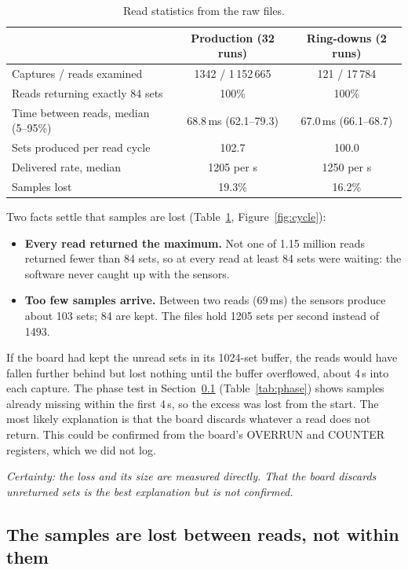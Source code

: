 \documentclass[11pt]{article}
\begin{document}
\begin{table}[H]
  \centering
  \begin{tabular}{lcc}
    \toprule
    & Production (32 runs) & Ring-downs (2 runs) \\
    \midrule
    Captures / reads examined & 1342 / 1\,152\,665 & 121 / 17\,784 \\
    Reads returning exactly 84 sets & 100\% & 100\% \\
    Time between reads, median (5--95\%) & 68.8\,ms (62.1--79.3) & 67.0\,ms (66.1--68.7) \\
    Sets produced per read cycle & 102.7 & 100.0 \\
    Delivered rate, median & 1205 per s & 1250 per s \\
    Samples lost & 19.3\% & 16.2\% \\
    \bottomrule
  \end{tabular}
  \caption{Read statistics from the raw files.}
  \label{tab:reads}
\end{table}

Two facts settle that samples are lost (Table~\ref{tab:reads},
Figure~\ref{fig:cycle}):
\begin{itemize}
  \item \textbf{Every read returned the maximum.} Not one of 1.15 million
        reads returned fewer than 84 sets, so at every read at least 84 sets
        were waiting: the software never caught up with the sensors.
  \item \textbf{Too few samples arrive.} Between two reads (69\,ms) the
        sensors produce about 103 sets; 84 are kept. The files hold 1205 sets
        per second instead of 1493.
\end{itemize}
If the board had kept the unread sets in its 1024-set buffer, the reads would
have fallen further behind but lost nothing until the buffer overflowed,
about 4\,s into each capture. The phase test in Section~\ref{sec:where}
(Table~\ref{tab:phase}) shows samples already missing within the first 4\,s,
so the excess was lost from the start. The most likely explanation is that the
board discards whatever a read does not return. This could be confirmed from
the board's OVERRUN and COUNTER registers, which we did not log.

\textit{Certainty: the loss and its size are measured directly. That the board
discards unreturned sets is the best explanation but is not confirmed.}

\subsection{The samples are lost between reads, not within them}
\label{sec:where}
\end{document}
